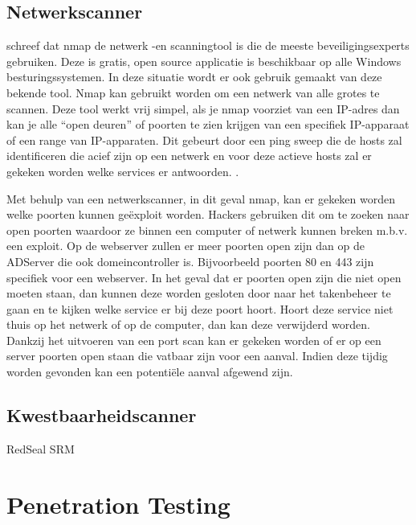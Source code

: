 \documentclass[pdftex,a4paper,12pt]{report}
\begin{document}
\section{Netwerkscanner}
\cite{Jackson2010} schreef dat nmap de netwerk -en scanningtool is die de meeste beveiligingsexperts gebruiken. Deze is gratis, open source applicatie is beschikbaar op alle Windows besturingssystemen. In deze situatie wordt er ook gebruik gemaakt van deze bekende tool. Nmap kan gebruikt worden om een netwerk van alle grotes te scannen. Deze tool werkt vrij simpel, als je nmap voorziet van een IP-adres dan kan je alle "`open deuren"' of poorten te zien krijgen van een specifiek IP-apparaat of een range van IP-apparaten. Dit gebeurt door een ping sweep die de hosts zal identificeren die acief zijn op een netwerk en voor deze actieve hosts zal er gekeken worden welke services er antwoorden. \citep{Messer2007}. \newline

Met behulp van een netwerkscanner, in dit geval nmap, kan er gekeken worden welke poorten kunnen geëxploit worden. Hackers gebruiken dit om te zoeken naar open poorten waardoor ze binnen een computer of netwerk kunnen breken m.b.v. een exploit. Op de webserver zullen er meer poorten open zijn dan op de ADServer die ook domeincontroller is. Bijvoorbeeld poorten 80 en 443 zijn specifiek voor een webserver. In het geval dat er poorten open zijn die niet open moeten staan, dan kunnen deze worden gesloten door naar het takenbeheer te gaan en te kijken welke service er bij deze poort hoort. Hoort deze service niet thuis op het netwerk of op de computer, dan kan deze verwijderd worden. Dankzij het uitvoeren van een port scan kan er gekeken worden of er op een server poorten open staan die vatbaar zijn voor een aanval. Indien deze tijdig worden gevonden kan een potentiële aanval afgewend zijn.

\section{Kwestbaarheidscanner}
RedSeal SRM


 


\chapter{Penetration Testing}
\end{document}
